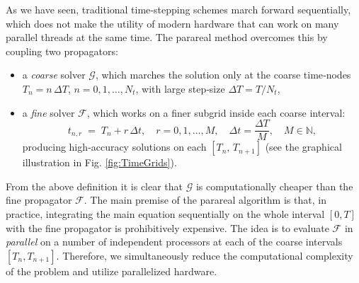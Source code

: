 \documentclass[12pt,a4paper]{article}
\begin{document}
As we have seen, traditional time‐stepping schemes march forward sequentially, which does not make the utility of modern hardware that can work on many parallel threads at the same time. The parareal method overcomes this by coupling two propagators:
\begin{itemize}
	\item a \emph{coarse} solver \(\mathcal{G}\), which marches the solution only at the coarse time‐nodes
	$T_n = n\,\Delta T$, \(n=0,1,\dots,N_t\), with large step‐size \(\Delta T = T/N_t\),
	\item a \emph{fine} solver \(\mathcal{F}\), which works on a finer subgrid inside each coarse interval:
	\begin{equation}\label{eqn:FineGrid}
		t_{n,r} \;=\; T_n + r\,\Delta t,\quad r=0,1,\dots,M,\quad \Delta t = \frac{\Delta T}{M}, \quad M \in \mathbb{N},
	\end{equation}
	producing high‐accuracy solutions on each \([T_n,\,T_{n+1}]\) (see the graphical illustration in Fig. \ref{fig:TimeGrids}). 
\end{itemize}
From the above definition it is clear that $\mathcal{G}$ is computationally cheaper than the fine propagator $\mathcal{F}$. The main premise of the parareal algorithm is that, in practice, integrating the main equation sequentially on the whole interval $[0,T]$ with the fine propagator is prohibitively expensive. The idea is to evaluate $\mathcal{F}$ in \emph{parallel} on a number of independent processors at each of the coarse intervals $[T_n, T_{n+1}]$. Therefore, we simultaneously reduce the computational complexity of the problem and utilize parallelized hardware. 
\end{document}
